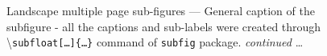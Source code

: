 \documentclass[phd]{ndsu-thesis-2022}
\newcommand\cmd[1]{\textbackslash\texttt{#1}}  %
\begin{document}
\begin{landscape}
\begin{figure}[p]
\\
\hspace{0.5in}
\hspace{0.5in}
\hspace{0.5in}
\hspace{0.5in}
\\
\captionsetup{singlelinecheck=false} %
\caption{Landscape multiple page sub-figures --- General caption of the subfigure - all the captions and sub-labels were created through \cmd{subfloat[\ldots]\{\ldots\}} command of \texttt{subfig} package. \emph{continued} \ldots} \label{fig:1gen1}
\end{figure}
\clearpage


\end{landscape}
\end{document}
